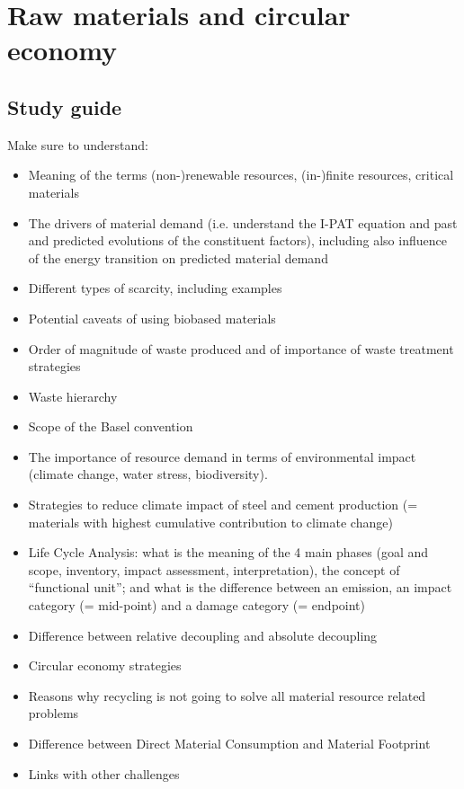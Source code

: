 \documentclass[../summary.tex]{subfiles}
\begin{document}
	
	\section{Raw materials and circular economy}
	
	\subsection{Study guide}
	
	Make sure to understand:
	\begin{itemize}
		\item  Meaning of the terms (non-)renewable resources, (in-)finite resources, critical materials
		\item The drivers of material demand (i.e. understand the I-PAT equation and past and predicted evolutions of the constituent factors), including also influence of the energy transition on predicted material demand
		\item Different types of scarcity, including examples
		\item Potential caveats of using biobased materials
		\item Order of magnitude of waste produced and of importance of waste treatment strategies
		\item Waste hierarchy
		\item Scope of the Basel convention
		\item The importance of resource demand in terms of environmental impact (climate change, water stress, biodiversity).
		\item Strategies to reduce climate impact of steel and cement production (= materials with highest cumulative contribution to climate change)
		\item Life Cycle Analysis: what is the meaning of the 4 main phases (goal and scope, inventory, impact assessment, interpretation), the concept of “functional unit”; and what is the difference between
		an emission, an impact category (= mid-point) and a damage category (= endpoint)
		\item Difference between relative decoupling and absolute decoupling
		\item Circular economy strategies
		\item Reasons why recycling is not going to solve all material resource related problems
		\item Difference between Direct Material Consumption and Material Footprint
		\item Links with other challenges
	\end{itemize}
	
\end{document}
